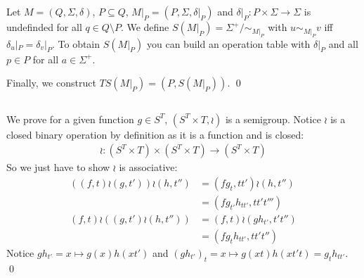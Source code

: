 \documentclass[a4paper,12pt,numbers=noenddot]{scrreport}
\begin{document}

\chapter{}
\section{}
\section{}
Let $M = (Q, \Sigma, \delta)$, $P \subseteq Q$, $M|_P=(P, \Sigma, \delta|_P)$ and $\delta|_P: P \times \Sigma \rightarrow \Sigma$ is undefinded for all $q \in Q\setminus P$.
We define $S(M|_P) = \Sigma^+ / \sim_{M|_P}$ with $u \sim_{M|_P} v$ iff $\delta_u|_P = \delta_v|_P$.
To obtain $S(M|_P)$ you can build an operation table with $\delta|_P$ and all $p \in P$ for all $a \in \Sigma^+$.

Finally, we construct $TS(M|_P) = (P, S(M|_P))$.
\qed
\section{}
\section{}
We prove for a given function $g \in S^T$, $(S^T \times T, \wr)$ is a semigroup.
Notice $\wr$ is a closed binary operation by definition as it is a function and is closed:
\begin{align*}
    \wr: (S^T \times T) \times (S^T \times T) \rightarrow (S^T \times T)
\end{align*}
So we just have to show $\wr$ is associative:
\begin{align*}
    ((f,t) \wr (g, t')) \wr (h, t'') &= (fg_{t}, tt') \wr (h, t'') \\
                                     &= (fg_{t'}h_{tt'}, tt't''') \\
    (f,t) \wr ((g,t') \wr (h, t'')) &= (f,t) \wr (gh_{t'}, t't'') \\
                                    &= (fg_{t}h_{tt'}, tt't'')
\end{align*}
Notice $gh_{t'} = x \mapsto g(x)h(xt')$ and $(gh_{t'})_t = x \mapsto g(xt)h(xt't) = g_th_{tt'}$.
\qed
\end{document}
